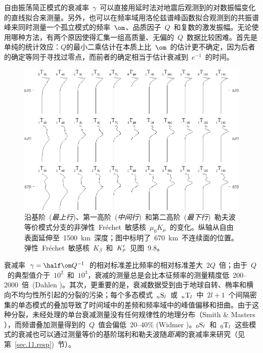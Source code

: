 自由振荡简正模式的衰减率~$\gamma$~可以直接用延时法对地震后观测到的对数振幅变化的直线拟合来测量。另外，也可以在频率域用洛伦兹谱峰函数拟合观测到的共振谱峰来同时测量一个孤立模式的频率~$\om$、品质因子~$Q$~和复数的激发振幅。无论使用哪种方法，有两个原因使得汇集一组高质量、无偏的~$Q$~数据比较困难。首先是单纯的统计效应：$Q$的最小二乘估计在本质上比~$\om$~的估计更不确定，因为后者的确定等同于寻找过零点，而前者的确定相当于估计衰减到~$e^{-1}$~的时间。
\begin{figure}[!t]
\begin{center}
\includegraphics{../figures/chap09/fig14.eps}
\end{center}
\caption[Qkernels3]{\label{9.fig.Qkern3}
沿基阶~({\em 最上行\/})、第一高阶~({\em 中间行\/})~和第二高阶~({\em 最下行\/})~勒夫波等价模式分支的非弹性~Fr\'{e}chet~敏感核~$\mu_0K_{\mu}$~的变化。纵轴从自由表面延伸至~1500~km~深度；图中标明了~670~km~不连续面的位置。弹性~Fr\'{e}chet~敏感核~$K_{\beta}$~和~$K_{\raisebox{0.3 ex}{\scriptsize$\rho$}}^{\prime}$~见图~9.8。
}
\end{figure}
衰减率~$\gamma=\half\om Q^{-1}$~的相对标准差比频率的相对标准差大~$2Q$~倍；由于~$Q$~的典型值介于~$10^2$~和~$10^3$，衰减的测量总是会比本征频率的测量精度低~200--2000~倍~(Dahlen \citeyear{dahlen82})。其次，更重要的是，衰减数据受到由于地球自转、椭率和横向不均匀性所引起的分裂的污染；每个多态模式~${}_n{\rm S}_l$~或~${}_n{\rm T}_l$~中~$2l+1$~个间隔密集的单态模式的叠加导致了时间域中的差频和频率域中的峰值偏移和扭曲。由于这种分裂，未经处理的单台衰减测量没有任何规律性的地理分布（Smith \& Masters \citeyear{smith&masters89}），而频谱叠加测量得到的~$Q$~值会偏低~20--40\% (Widmer \citeyear{widmer91})。${}_0{\rm S}_l$~和~${}_0{\rm T}_l$~这些模式的衰减也可以通过测量等价的基阶瑞利和勒夫波随{\em 距离\/}的衰减率来研究（见第~\ref{sec.11.resp})~节）。
